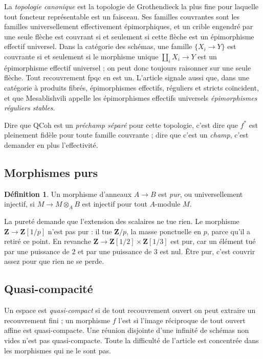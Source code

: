 \documentclass[11pt,a4paper]{amsart}
\theoremstyle{definition}
\newtheorem{definition}{Définition}
\theoremstyle{plain}
\theoremstyle{remark}
\newcommand{\Z}{\mathbf Z}
\newcommand{\QCoh}{\mathrm{QCoh}}
\begin{document}
La \emph{topologie canonique} est la topologie de Grothendieck la plus fine pour laquelle tout foncteur représentable est un faisceau. Ses familles couvrantes sont les familles universellement effectivement épimorphiques, et un crible engendré par une seule flèche est couvrant si et seulement si cette flèche est un épimorphisme effectif universel. Dans la catégorie des schémas, une famille $\{X_i\to Y\}$ est couvrante si et seulement si le morphisme unique $\coprod_iX_i\to Y$ est un épimorphisme effectif universel ; on peut donc toujours raisonner sur une seule flèche. Tout recouvrement fpqc en est un. L'article signale aussi que, dans une catégorie à produits fibrés, épimorphismes effectifs, réguliers et stricts coïncident, et que Mesablishvili appelle les épimorphismes effectifs universels \emph{épimorphismes réguliers stables}.

Dire que $\QCoh$ est un \emph{préchamp séparé} pour cette topologie, c'est dire que $f^*$ est pleinement fidèle pour toute famille couvrante ; dire que c'est un \emph{champ}, c'est demander en plus l'effectivité.

\subsection{Morphismes purs}

\begin{definition}
Un morphisme d'anneaux $A\to B$ est \emph{pur}, ou universellement injectif, si $M\to M\otimes_AB$ est injectif pour tout $A$-module $M$.
\end{definition}

La pureté demande que l'extension des scalaires ne tue rien. Le morphisme $\Z\to\Z[1/p]$ n'est pas pur : il tue $\Z/p$, la masse ponctuelle en $p$, parce qu'il a retiré ce point. En revanche $\Z\to\Z[1/2]\times\Z[1/3]$ est pur, car un élément tué par une puissance de $2$ et par une puissance de $3$ est nul. Être pur, c'est couvrir assez pour que rien ne se perde.

\subsection{Quasi-compacité}

Un espace est \emph{quasi-compact} si de tout recouvrement ouvert on peut extraire un recouvrement fini ; un morphisme $f$ l'est si l'image réciproque de tout ouvert affine est quasi-compacte. Une réunion disjointe d'une infinité de schémas non vides n'est pas quasi-compacte. Toute la difficulté de l'article est concentrée dans les morphismes qui ne le sont pas.
\end{document}

